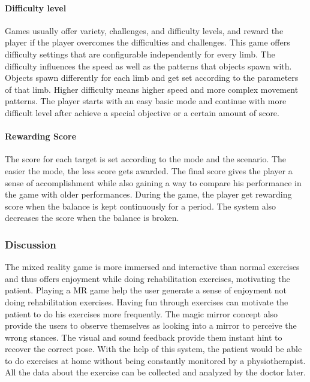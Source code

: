 \paragraph{Difficulty level}
Games usually offer variety, challenges, and difficulty levels, and reward the player if the player overcomes the difficulties and challenges.
This game offers difficulty settings that are configurable independently for every limb. The difficulty influences the speed as well as the patterns that objects spawn with. Objects spawn differently for each limb and get set according to the parameters of that limb. Higher difficulty means higher speed and more complex movement patterns.
The player starts with an easy basic mode and continue with more difficult level after achieve a special objective or a certain amount of score. 

\paragraph{Rewarding Score}
The score for each target is set according to the mode and the scenario. The easier the mode, the less score gets awarded. The final score gives the player a sense of accomplishment while also gaining a way to compare his performance in the game with older performances. During the game, the player get rewarding score when the balance is kept continuously for a period. The system also decreases the score when the balance is broken. 

\subsubsection{Discussion}
The mixed reality game is more immersed and interactive than normal exercises and thus offers enjoyment while doing rehabilitation exercises, motivating the patient. Playing a MR game help the user generate a sense of enjoyment not doing rehabilitation exercises. Having fun through exercises can motivate the patient to do his exercises more frequently. The magic mirror concept also provide the users to observe themselves as looking into a mirror to perceive the wrong stances. The visual and sound feedback provide them instant hint to recover the correct pose. With the help of this system, the patient would be able to do exercises at home without being constantly monitored by a physiotherapist. All the data about the exercise can be collected and analyzed by the doctor later.